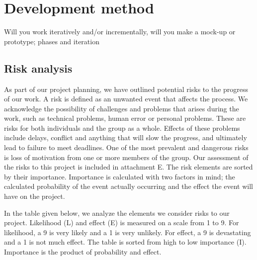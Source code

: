 \section{Development method}
Will you work iteratively and/or incrementally, will you make a 
mock-up or prototype; phases and iteration



\subsection{Risk analysis}
As part of our project planning, we have outlined potential risks to the progress of our work. A risk is defined as an unwanted event that affects the process. We acknowledge the possibility of challenges and problems that arises during the work, such as technical problems, human error or personal problems. These are risks for both individuals and the group as a whole. Effects of these problems include delays, conflict and anything that will slow the progress, and ultimately lead to failure to  meet deadlines. One of the most prevalent and dangerous risks is loss of motivation from one or more members of the group. Our assessment of the risks to this project is included in attachment E. The risk elements are sorted by their importance. Importance is calculated with two factors in mind; the calculated probability of the event actually occurring and the effect the event will have on the project. 

In the table given below, we analyze the elements we consider risks to our project. Likelihood (L) and effect (E) is measured on a scale from 1 to 9. For likelihood, a 9 is very likely and a 1 is very unlikely. For effect, a 9 is devastating and a 1 is not much effect. The table is sorted from high to low importance (I). Importance is the product of probability and effect. 




